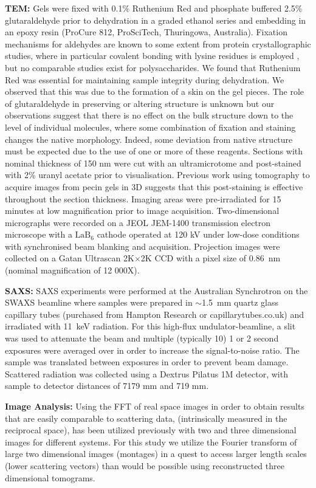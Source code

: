 \textbf{TEM: }Gels were fixed with 0.1\% Ruthenium Red and phosphate buffered 2.5\% glutaraldehyde prior to dehydration in a graded ethanol series and embedding in an epoxy resin (ProCure 812, ProSciTech, Thuringowa, Australia). Fixation mechanisms for aldehydes are known to some extent from protein crystallographic studies, where in particular covalent bonding with lysine residues is employed \cite{wine_elucidation_2007}, but no comparable studies exist for polysaccharides. We found that Ruthenium Red was essential for maintaining sample integrity during dehydration. We observed that this was due to the formation of a skin on the gel pieces. The role of glutaraldehyde in preserving or altering structure is unknown but our observations suggest that there is no effect on the bulk structure down to the level of individual molecules, where some combination of fixation and staining changes the native morphology. Indeed, some deviation from native structure must be expected due to the use of one or more of these reagents. Sections with nominal thickness of 150 nm were cut with an ultramicrotome and post-stained with 2\% uranyl acetate prior to visualisation. Previous work using tomography to acquire images from pecin gels in 3D \cite{mansel_zooming_2015} suggests that this post-staining is effective throughout the section thickness. Imaging areas were pre-irradiated for 15 minutes at low magnification prior to image acquisition. Two-dimensional micrographs were recorded on a JEOL JEM-1400 transmission electron microscope with a $\text{LaB}_6$ cathode operated at 120 kV under low-dose conditions with synchronised beam blanking and acquisition. Projection images were collected on a Gatan Ultrascan 2K$\times$2K CCD with a pixel size of \SI{0.86}{\nm} (nominal magnification of 12 000X).

\textbf{SAXS:} SAXS experiments were performed at the Australian Synchrotron on the SWAXS beamline where samples were prepared in $\sim$\SI{1.5}{\mm} quartz glass capillary tubes (purchased from Hampton Research or capillarytubes.co.uk) and irradiated with \SI{11}{\keV} radiation. For this high-flux undulator-beamline, a slit was used to attenuate the beam and multiple (typically 10) 1 or 2 second exposures were averaged over in order to increase the signal-to-noise ratio. The sample was translated between exposures in order to prevent beam damage. Scattered radiation was collected using a Dextrus Pilatus 1M detector, with sample to detector distances of 7179 mm and 719 mm.

\textbf{Image Analysis:}
Using the FFT of real space images in order to obtain results that are easily comparable to scattering data, (intrinsically measured in the reciprocal space), has been utilized previously with two \cite{tanaka_application_1986} and three dimensional images \cite{takahashi_real_2003} for different systems. For this study we utilize the Fourier transform of large two dimensional images (montages) in a quest to access larger length scales (lower scattering vectors) than would be possible using reconstructed three dimensional tomograms.


